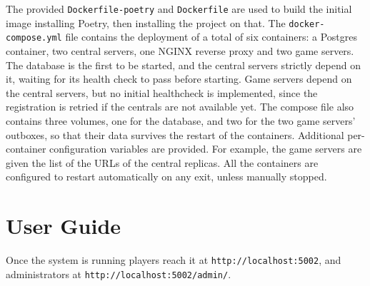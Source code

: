 \documentclass{scrartcl}
\begin{document}
The provided \texttt{Dockerfile-poetry} and \texttt{Dockerfile} are used to build the initial image installing Poetry, then installing the project on that.
The \texttt{docker-compose.yml} file contains the deployment of a total of six containers: a Postgres container, two central servers, one NGINX reverse proxy and two game servers.
The database is the first to be started, and the central servers strictly depend on it, waiting for its health check to pass before starting.
Game servers depend on the central servers, but no initial healthcheck is implemented, since the registration is retried if the centrals are not available yet.
The compose file also contains three volumes, one for the database, and two for the two game servers' outboxes, so that their data survives the restart of the containers.
Additional per-container configuration variables are provided.
For example, the game servers are given the list of the URLs of the central replicas.
All the containers are configured to restart automatically on any exit, unless manually stopped.



  
  

\section{User Guide}\label{user-guide}

Once the system is running players reach it at \texttt{http://localhost:5002},
and administrators at \texttt{http://localhost:5002/admin/}.
\end{document}
